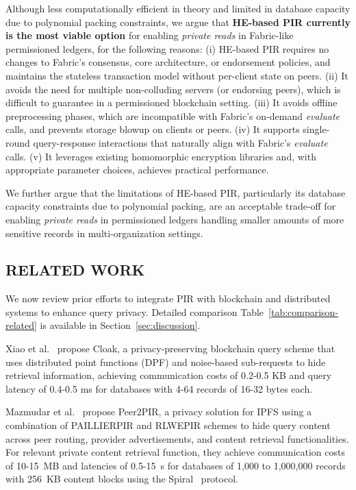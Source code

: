 \documentclass[letterpaper,journal]{IEEEtran}
\begin{document}
Although less computationally efficient in theory and limited in database capacity due to polynomial packing constraints, we argue that 
\textbf{HE-based PIR currently is the most viable option} for enabling \emph{private reads} in Fabric-like permissioned ledgers, for the following reasons:
(i) HE-based PIR requires no changes to Fabric’s consensus, core architecture, or endorsement policies, 
and maintains the stateless transaction model without per-client state on peers.
(ii) It avoids the need for multiple non-colluding servers (or endorsing peers), which is difficult to guarantee in a permissioned blockchain setting.
(iii) It avoids offline preprocessing phases, which are incompatible with Fabric’s on-demand \emph{evaluate} calls, 
and prevents storage blowup on clients or peers.
(iv) It supports single-round query-response interactions that naturally align with Fabric's \emph{evaluate} calls.
(v) It leverages existing homomorphic encryption libraries and, with appropriate parameter choices, achieves practical performance.

We further argue that the limitations of HE-based PIR, particularly its database capacity constraints due to polynomial packing,
are an acceptable trade-off for enabling \emph{private reads} in permissioned ledgers handling smaller amounts of more
sensitive records in multi-organization settings.

\subsection{RELATED WORK}
We now review prior efforts to integrate PIR with blockchain and distributed systems to enhance query privacy. 
Detailed comparison Table~\ref{tab:comparison-related} is available in Section~\ref{sec:discussion}.

Xiao et al.~\cite{xiao_cloak_2024} propose Cloak, a privacy-preserving blockchain query scheme that uses distributed point functions (DPF) 
and noise-based sub-requests to hide retrieval information, achieving communication costs of 0.2-0.5 KB and query latency of 0.4-0.5 ms 
for databases with 4-64 records of 16-32 bytes each.

Mazmudar et al.~\cite{mazmudar_peer2pir_2025} propose Peer2PIR, a privacy solution for IPFS using a combination of PAILLIERPIR and RLWEPIR schemes 
to hide query content across peer routing, provider advertisements, and content retrieval functionalities.
For relevant private content retrieval function, they achieve communication costs of 10-15~MB and latencies of 0.5-15~s for 
databases of 1,000 to 1,000,000 records with 256~KB content blocks using the Spiral~\cite{spiral_2022} protocol.
\end{document}
